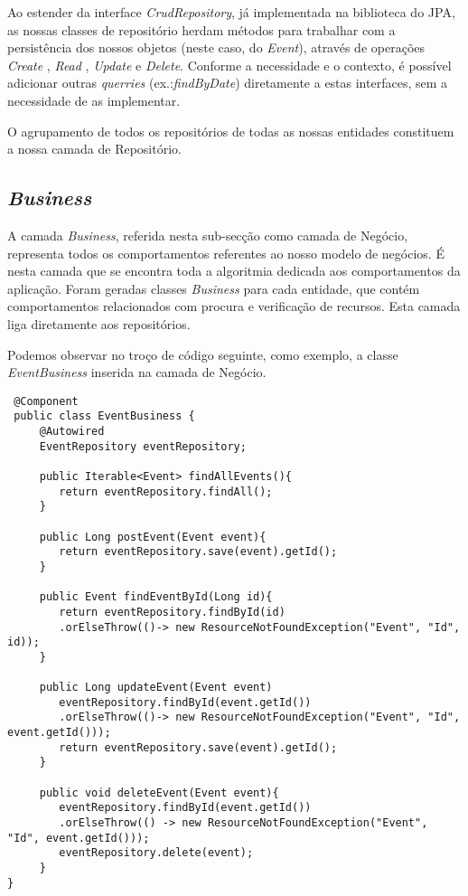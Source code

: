 Ao estender da interface \emph{CrudRepository}, já implementada na biblioteca do JPA, as nossas classes de repositório herdam métodos para trabalhar com a persistência dos nossos objetos (neste caso, do \emph{Event}), através de operações \emph{Create} , \emph{Read} , \emph{Update} e \emph{Delete}. Conforme a necessidade e o contexto, é possível adicionar
outras \emph{querries} (ex.:\emph{findByDate}) diretamente a estas interfaces, sem a necessidade de as implementar. 

O agrupamento de todos os repositórios de todas as nossas entidades constituem a nossa camada de Repositório.
\subsection{\emph{Business}} \label{sec313}
A camada \emph{Business}, referida nesta sub-secção como camada de Negócio, representa todos os comportamentos referentes ao nosso modelo de negócios.
É nesta camada que se encontra toda a algoritmia dedicada aos comportamentos da aplicação. Foram geradas classes \emph{Business} para cada entidade, que contém comportamentos relacionados com procura e verificação de recursos. Esta camada liga diretamente aos repositórios.

Podemos observar no troço de código seguinte, como exemplo, a classe \emph{EventBusiness} inserida na camada de Negócio.
\begin{lstlisting}
 @Component
 public class EventBusiness {
	 @Autowired
	 EventRepository eventRepository;
	
	 public Iterable<Event> findAllEvents(){
	  	return eventRepository.findAll();
	 }
	
	 public Long postEvent(Event event){
		return eventRepository.save(event).getId();
	 }
	
	 public Event findEventById(Long id){
	 	return eventRepository.findById(id)
	 	.orElseThrow(()-> new ResourceNotFoundException("Event", "Id", id));
	 }
	
	 public Long updateEvent(Event event)
	 	eventRepository.findById(event.getId())
		.orElseThrow(()-> new ResourceNotFoundException("Event", "Id", event.getId()));
		return eventRepository.save(event).getId();
	 }
	
	 public void deleteEvent(Event event){
	 	eventRepository.findById(event.getId())
		.orElseThrow(() -> new ResourceNotFoundException("Event", "Id", event.getId()));
		eventRepository.delete(event);
	 }
}
\end{lstlisting}

